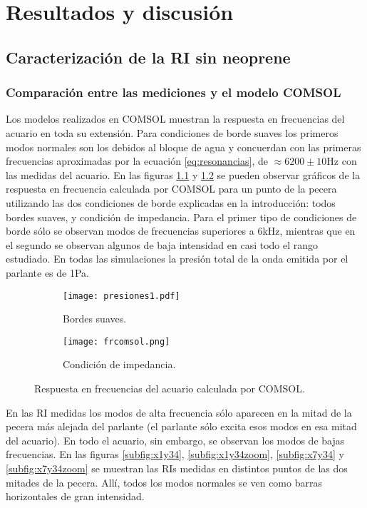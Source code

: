 \chapter{Resultados y discusión}

\section{Caracterización de la RI sin neoprene} 

\subsection{Comparación entre las mediciones y el modelo COMSOL}

Los modelos realizados en COMSOL muestran la respuesta en frecuencias del acuario en toda su extensión. Para condiciones de borde suaves los primeros modos normales son los debidos al bloque de agua y concuerdan con las primeras frecuencias aproximadas por la ecuación \ref{eq:resonancias}, de $\approx 6200\pm10$Hz con las medidas del acuario. En las figuras \ref{subfig:comsolsuave} y \ref{subfig:comsolmedio} se pueden observar gráficos de la respuesta en frecuencia calculada por COMSOL para un punto de la pecera utilizando las dos condiciones de borde explicadas en la introducción: todos bordes suaves, y condición de impedancia. Para el primer tipo de condiciones de borde sólo se observan modos de frecuencias superiores a 6kHz, mientras que en el segundo se observan algunos de baja intensidad en casi todo el rango estudiado. En todas las simulaciones la presión total de la onda emitida por el parlante es de 1Pa.

\begin{figure}[H]
	\begin{subfigure}[b]{.49\textwidth}
		\centering
			\texttt{[image: presiones1.pdf]}
			\caption{Bordes suaves.}
			\label{subfig:comsolsuave}
	\end{subfigure}
	\hfill
	\begin{subfigure}[b]{.49\textwidth}
		\centering
			\texttt{[image: frcomsol.png]}
			\caption{Condición de impedancia.}
			\label{subfig:comsolmedio}
	\end{subfigure}
	\caption{Respuesta en frecuencias del acuario calculada por COMSOL.}
	\label{fig:frcomsol}
\end{figure}

En las RI medidas los modos de alta frecuencia sólo aparecen en la mitad de la pecera más alejada del parlante (el parlante sólo excita esos modos en esa mitad del acuario). En todo el acuario, sin embargo, se observan los modos de bajas frecuencias. En las figuras \ref{subfig:x1y34}, \ref{subfig:x1y34zoom}, \ref{subfig:x7y34} y \ref{subfig:x7y34zoom} se muestran las RIs medidas en distintos puntos de las dos mitades de la pecera. Allí, todos los modos normales se ven como barras horizontales de gran intensidad.

